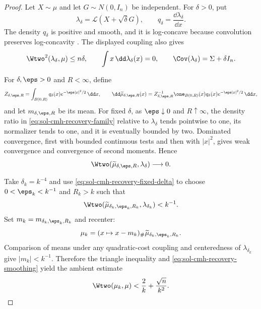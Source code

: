 \documentclass[../main.tex]{subfiles}
\begin{document}
\begin{proof}
Let $X\sim\mu$ and let $G\sim N(0,I_n)$ be independent.  For $\delta>0$, put
\[
  \lambda_\delta=\mathcal L(X+\sqrt\delta G),
  \qquad q_\delta=\frac{\dd\lambda_\delta}{\dd x}.
\]
The density $q_\delta$ is positive and smooth, and it is log-concave because convolution
preserves log-concavity \cite{BrascampLieb1976}.  The displayed coupling also gives
\begin{equation}
  \Wtwo^2(\lambda_\delta,\mu)\le n\delta,
  \qquad \int x\,\dd\lambda_\delta(x)=0,
  \qquad \Cov(\lambda_\delta)=\Sigma+\delta I_n.
  \label{eq:sol-cmh-recovery-smoothing}
\end{equation}

For $\delta,\eps>0$ and $R<\infty$, define
\begin{equation}
 Z_{\delta,\eps,R}
 =\int_{B(0,R)}q_\delta(x)e^{-\eps|x|^2/2}\,\dd x,
 \qquad
 \dd\widetilde\mu_{\delta,\eps,R}(x)
 =Z_{\delta,\eps,R}^{-1}\one_{B(0,R)}(x)
   q_\delta(x)e^{-\eps|x|^2/2}\,\dd x,
 \label{eq:sol-cmh-recovery-family}
\end{equation}
and let $m_{\delta,\eps,R}$ be its mean.  For fixed $\delta$, as $\eps\downarrow0$ and
$R\uparrow\infty$, the density ratio in \eqref{eq:sol-cmh-recovery-family} relative to
$\lambda_\delta$ tends pointwise to one, its normalizer tends to one, and it is eventually
bounded by two.  Dominated convergence, first with bounded continuous tests and then with
$|x|^2$, gives weak convergence and convergence of second moments.  Hence
\begin{equation}
  \Wtwo(\widetilde\mu_{\delta,\eps,R},\lambda_\delta)\longrightarrow0.
  \label{eq:sol-cmh-recovery-fixed-delta}
\end{equation}

Take $\delta_k=k^{-4}$ and use \eqref{eq:sol-cmh-recovery-fixed-delta} to choose
$0<\eps_k<k^{-1}$ and $R_k>k$ such that
\[
  \Wtwo(\widetilde\mu_{\delta_k,\eps_k,R_k},\lambda_{\delta_k})<k^{-1}.
\]
Set $m_k=m_{\delta_k,\eps_k,R_k}$ and recenter:
\[
  \mu_k=(x\mapsto x-m_k)_\#\widetilde\mu_{\delta_k,\eps_k,R_k}.
\]
Comparison of means under any quadratic-cost coupling and centeredness of $\lambda_{\delta_k}$
give $|m_k|<k^{-1}$.  Therefore the triangle inequality and
\eqref{eq:sol-cmh-recovery-smoothing} yield the ambient estimate
\begin{equation}
  \Wtwo(\mu_k,\mu)<\frac2k+\frac{\sqrt n}{k^2}.
  \label{eq:sol-cmh-recovery-diagonal}
\end{equation}


\end{proof}
\end{document}
